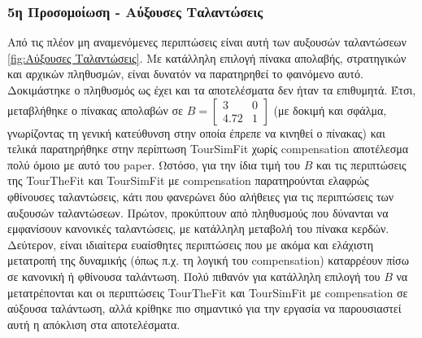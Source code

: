 \documentclass[12pt]{article}
\begin{document}
\subsubsection{5η Προσομοίωση - Αύξουσες Ταλαντώσεις}
Από τις πλέον μη αναμενόμενες περιπτώσεις είναι αυτή των αυξουσών ταλαντώσεων \ref{fig:Αύξουσες Ταλαντώσεις}. Με κατάλληλη επιλογή πίνακα απολαβής, στρατηγικών και αρχικών πληθυσμών, είναι δυνατόν να παρατηρηθεί το φαινόμενο αυτό. Δοκιμάστηκε ο πληθυσμός ως έχει και τα αποτελέσματα δεν ήταν τα επιθυμητά. Έτσι, μεταβλήθηκε ο πίνακας απολαβών σε $B = \begin{bmatrix} 3 & 0 \\4.72 & 1 \end{bmatrix}$ (με δοκιμή και σφάλμα, γνωρίζοντας τη γενική κατεύθυνση στην οποία έπρεπε να κινηθεί ο πίνακας) και τελικά παρατηρήθηκε στην περίπτωση TourSimFit χωρίς compensation αποτέλεσμα πολύ όμοιο με αυτό του paper. Ωστόσο, για την ίδια τιμή του $B$ και τις περιπτώσεις της TourTheFit και TourSimFit με compensation παρατηρούνται ελαφρώς φθίνουσες ταλαντώσεις, κάτι που φανερώνει δύο αλήθειες για τις περιπτώσεις των αυξουσών ταλαντώσεων. Πρώτον, προκύπτουν από πληθυσμούς που δύνανται να εμφανίσουν κανονικές ταλαντώσεις, με κατάλληλη μεταβολή του πίνακα κερδών. Δεύτερον, είναι ιδιαίτερα ευαίσθητες περιπτώσεις που με ακόμα και ελάχιστη μετατροπή της δυναμικής (όπως π.χ. τη λογική του compensation) καταρρέουν πίσω σε κανονική ή φθίνουσα ταλάντωση. Πολύ πιθανόν για κατάλληλη επιλογή του $B$ να μετατρέπονται και οι περιπτώσεις TourTheFit και TourSimFit με compensation σε αύξουσα ταλάντωση, αλλά κρίθηκε πιο σημαντικό για την εργασία να παρουσιαστεί αυτή η απόκλιση στα αποτελέσματα.
\end{document}
